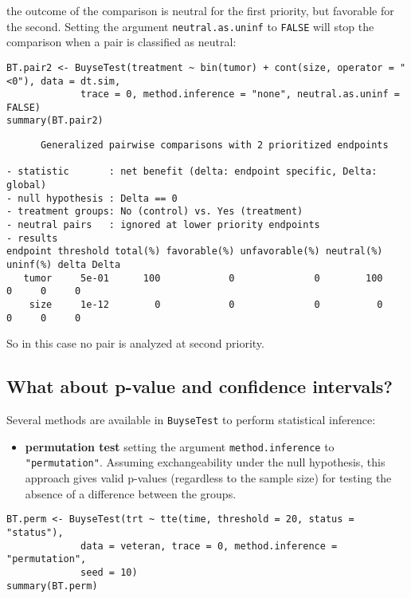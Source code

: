 \documentclass[12pt]{article}
\begin{document}
the outcome of the comparison is neutral for the first priority, but
favorable for the second. Setting the argument \texttt{neutral.as.uninf} to
\texttt{FALSE} will stop the comparison when a pair is classified as neutral:
\lstset{language=r,label= ,caption= ,captionpos=b,numbers=none}
\begin{lstlisting}
BT.pair2 <- BuyseTest(treatment ~ bin(tumor) + cont(size, operator = "<0"), data = dt.sim,
		     trace = 0, method.inference = "none", neutral.as.uninf = FALSE)
summary(BT.pair2)
\end{lstlisting}

\begin{verbatim}
      Generalized pairwise comparisons with 2 prioritized endpoints

- statistic       : net benefit (delta: endpoint specific, Delta: global) 
- null hypothesis : Delta == 0 
- treatment groups: No (control) vs. Yes (treatment) 
- neutral pairs   : ignored at lower priority endpoints
- results
endpoint threshold total(%) favorable(%) unfavorable(%) neutral(%) uninf(%) delta Delta
   tumor     5e-01      100            0              0        100        0     0     0
    size     1e-12        0            0              0          0        0     0     0
\end{verbatim}

So in this case no pair is analyzed at second priority.

\clearpage

\subsection{What about p-value and confidence intervals?}
\label{sec:orgbf79918}

Several methods are available in \texttt{BuyseTest} to perform statistical inference:
\begin{itemize}
\item \textbf{permutation test} setting the argument \texttt{method.inference} to
\texttt{"permutation"}. Assuming exchangeability under the null hypothesis,
this approach gives valid p-values (regardless to the sample size)
for testing the absence of a difference between the groups.
\end{itemize}
\lstset{language=r,label= ,caption= ,captionpos=b,numbers=none}
\begin{lstlisting}
BT.perm <- BuyseTest(trt ~ tte(time, threshold = 20, status = "status"),
		     data = veteran, trace = 0, method.inference = "permutation",
		     seed = 10) 
summary(BT.perm)
\end{lstlisting}
\end{document}
